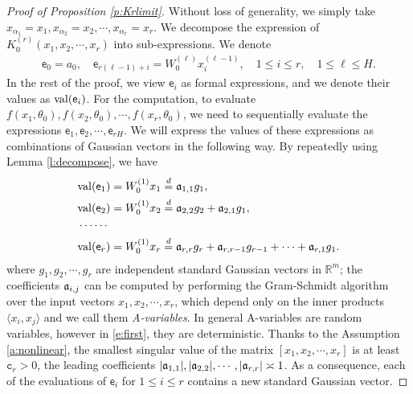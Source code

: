 \documentclass{article}
\numberwithin{equation}{section}
\newcommand{\fc}{{\mathtt c}}
\newcommand{\fa}{{\frak a}}
\newcommand{\sfe}{{\mathsf e}}
\newcommand{\bR}{{\mathbb R}}
\newcommand{\al}{\alpha}
\renewcommand{\leq}{\leqslant}
\newcommand{\1}{\mathds{1}}
\theoremstyle{plain} %
\newcommand{\val}{{\rm val}}
\begin{document}
\begin{proof}[Proof of Proposition \ref{p:Krlimit}]
Without loss of generality, we simply take $x_{\al_1}=x_1, x_{\al_2}=x_2, \cdots, x_{\al_r}=x_r$. We decompose the expression of $K_0^{(r)}(x_1,x_2,\cdots,x_r)$ into sub-expressions. We denote
\begin{align*}
\sfe_0=a_0,\quad  \sfe_{r(\ell-1)+i}=W_0^{(\ell)} x^{(\ell-1)}_{i},\quad 1\leq i\leq r,\quad 1\leq \ell\leq H.
\end{align*}
In the rest of the proof, we view $\sfe_i$ as formal expressions, and we denote their values as $\val(\sfe_i)$. For the computation, to evaluate $f(x_1,\theta_0), f(x_2,\theta_0), \cdots, f(x_r,\theta_0)$, we need to sequentially evaluate the expressions $ \sfe_1,  \sfe_2,\cdots, \sfe_{rH}$. We will express the values of these expressions as combinations of Gaussian vectors in the following way. By repeatedly using Lemma \ref{l:decompose}, we have
\begin{align}\begin{split}\label{e:first}
&\val( \sfe_1)=W_0^{(1)}x_1\stackrel{d}{=}\fa_{1,1}g_1,\\
&\val( \sfe_2)=W_0^{(1)}x_2\stackrel{d}{=}\fa_{2,2}g_2+\fa_{2,1}g_{1},\\
&\cdots\cdots\\
&\val( \sfe_r)=W_0^{(1)}x_r\stackrel{d}{=}\fa_{r,r}g_r+\fa_{r,r-1}g_{r-1}+\cdots+\fa_{r,1}g_1.
\end{split}\end{align}
where $g_1, g_2,\cdots, g_r$ are independent standard Gaussian vectors in $\bR^m$; the coefficients $\fa_{i,j}$ can be computed by performing the Gram-Schmidt algorithm over the input vectors $x_1,x_2,\cdots,x_r$, which depend only on the inner products $\langle x_i, x_j\rangle$ and we call them \emph{A-variables}. In general A-variables are random variables, however in \eqref{e:first}, they are deterministic. Thanks to the Assumption \ref{a:nonlinear}, the smallest singular value of the matrix $[x_{1}, x_{2}, \cdots, x_{r}]$ is at least $\fc_r>0$, the leading coefficients $|\fa_{1,1}|, |\fa_{2,2}|, \cdots, |\fa_{r,r}|\asymp 1$. As a consequence, each of the evaluations of $\sfe_i$ for $1\leq i\leq r$ contains a new standard Gaussian vector.


\end{proof}
\end{document}
